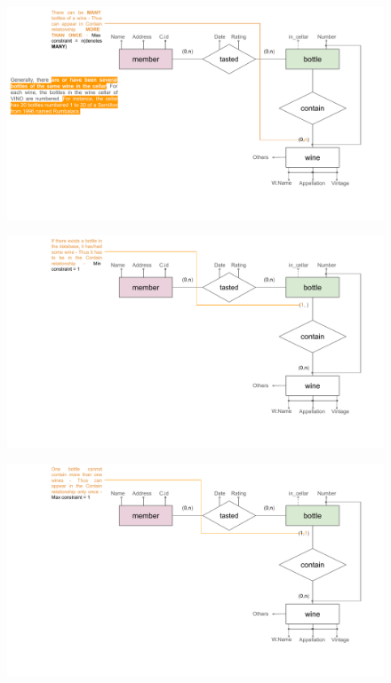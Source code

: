 \documentclass{beamer}
\begin{document}
\begin{frame}
    \begin{figure}
        \centering
        \includegraphics[width=1.1\linewidth]{tut_02_files/16.pdf}
    \end{figure}
\end{frame}

\begin{frame}
    \begin{figure}
        \centering
        \includegraphics[width=1.1\linewidth]{tut_02_files/17.pdf}
    \end{figure}
\end{frame}

\begin{frame}
    \begin{figure}
        \centering
        \includegraphics[width=1.1\linewidth]{tut_02_files/18.pdf}
    \end{figure}
\end{frame}
\end{document}

